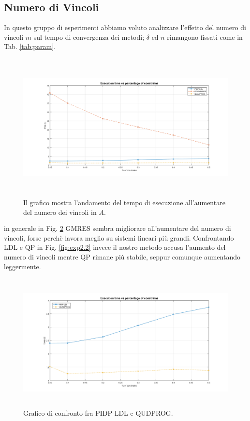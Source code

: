 \subsection*{Numero di Vincoli}

 In questo gruppo di esperimenti abbiamo voluto analizzare l'effetto del numero di vincoli $m$ sul tempo di convergenza dei metodi; $\delta$ ed $n$ rimangono fissati come in Tab. \ref{tab:param}.

\begin{figure}[!h]
    \centering
    \includegraphics[width=\textwidth, height=7.5cm]{img/MU2.png}
    \caption{Il grafico mostra l'andamento del tempo di esecuzione all'aumentare del numero dei vincoli in $A$. \label{fig:exp2}}
\end{figure}
 
in generale in Fig. \ref{fig:exp2.1} GMRES sembra migliorare all'aumentare del numero di vincoli, forse perchè lavora meglio su sistemi lineari più grandi. Confrontando LDL e QP in Fig. \ref{fig:exp2.2} invece il nostro metodo accusa l'aumento del numero di vincoli mentre QP rimane più stabile, seppur comunque aumentando leggermente. 
 
\begin{figure}[!h]
    \centering
    \includegraphics[width=\textwidth, height=7cm]{img/MU3.png}
    \caption{Grafico di confronto fra PIDP-LDL e QUDPROG. \label{fig:exp2.1}}
\end{figure}

